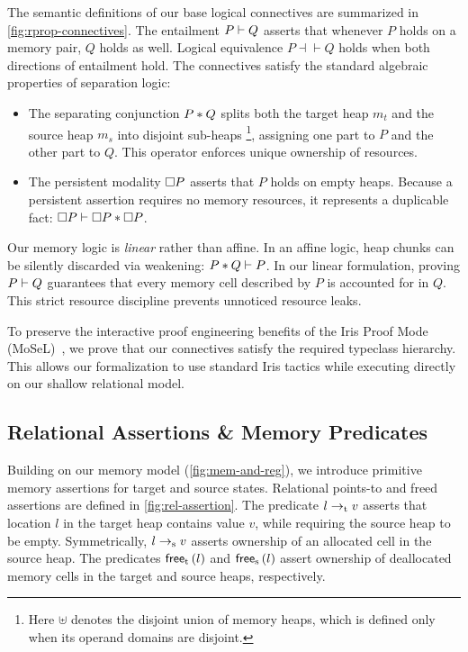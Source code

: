 \documentclass[report.tex]{subfiles}
\begin{document}
The semantic definitions of our base logical connectives are summarized in
\cref{fig:rprop-connectives}.
The entailment $P \vdash Q$ asserts that whenever $P$ holds on a memory pair,
$Q$ holds as well.
Logical equivalence $P \dashv\vdash Q$ holds
when both directions of entailment hold.
The connectives satisfy the standard algebraic properties of separation logic:

\begin{itemize}
  \item The separating conjunction $P \mathbin{\ast} Q$ splits both the target heap $m_t$
        and the source heap $m_s$ into disjoint sub-heaps%
        \footnote{Here $\uplus$ denotes the disjoint union of memory heaps,
          which is defined only when its operand domains are disjoint.},
        assigning one part to $P$
        and the other part to $Q$.
        This operator enforces unique ownership of resources.

  \item The persistent modality $\Box P$ asserts that $P$ holds on empty heaps.
        Because a persistent assertion requires no memory resources,
        it represents a duplicable fact:
        $\Box P \vdash \Box P \mathbin{\ast} \Box P$.
\end{itemize}

Our memory logic is \emph{linear} rather than affine.
In an affine logic,
heap chunks can be silently discarded via weakening:
$P \mathbin{\ast} Q \vdash P$.
In our linear formulation,
proving $P \vdash Q$ guarantees that every memory cell described by $P$
is accounted for in $Q$.
This strict resource discipline prevents unnoticed resource leaks.

To preserve the interactive proof engineering benefits of the
Iris Proof Mode (MoSeL)~\parencite{krebbers-18-mosel},
we prove that our connectives satisfy the required typeclass hierarchy.
This allows our formalization to use standard Iris tactics
while executing directly on our shallow relational model.

\subsection{Relational Assertions \& Memory Predicates}
\label{sec:mem-predicate}

Building on our memory model (\cref{fig:mem-and-reg}),
we introduce primitive memory assertions for target and source states.
Relational points-to and freed assertions are defined in \cref{fig:rel-assertion}.
The predicate $l \to_{\text{t}} v$ asserts that location $l$ in the target heap
contains value $v$,
while requiring the source heap to be empty.
Symmetrically,
$l \to_{\text{s}} v$ asserts ownership of an allocated cell in the source heap.
The predicates $\textsf{free}_{\text{t}}\left(l\right)$ and $\textsf{free}_{\text{s}}\left(l\right)$ assert ownership
of deallocated memory cells in the target and source heaps,
respectively.
\end{document}
